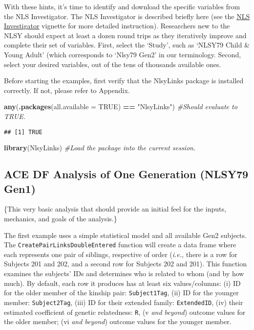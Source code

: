 \documentclass[smallextended]{svjour3}       %
\newenvironment{Shaded}{\begin{snugshade}}{\end{snugshade}}
\newcommand{\CommentTok}[1]{\textcolor[rgb]{0.56,0.35,0.01}{\textit{#1}}}
\newcommand{\DataTypeTok}[1]{\textcolor[rgb]{0.13,0.29,0.53}{#1}}
\newcommand{\KeywordTok}[1]{\textcolor[rgb]{0.13,0.29,0.53}{\textbf{#1}}}
\newcommand{\NormalTok}[1]{#1}
\newcommand{\OperatorTok}[1]{\textcolor[rgb]{0.81,0.36,0.00}{\textbf{#1}}}
\newcommand{\OtherTok}[1]{\textcolor[rgb]{0.56,0.35,0.01}{#1}}
\newcommand{\StringTok}[1]{\textcolor[rgb]{0.31,0.60,0.02}{#1}}
\begin{document}
With these hints, it's time to identify and download the specific
variables from the NLS Investigator. The NLS Investigator is described
briefly here (see the
\href{https://github.com/nlsy-links/NlsyLinks/blob/master/inst/doc/NlsInvestigator.pdf}{NLS
Investigator} vignette for more detailed instruction). Researchers new
to the NLSY should expect at least a dozen round trips as they
iteratively improve and complete their set of variables. First, select
the `Study', such as `NLSY79 Child \& Young Adult' (which corresponds to
`Nlsy79 Gen2' in our terminology. Second, select your desired variables,
out of the tens of thousands available ones.

Before starting the examples, first verify that the NlsyLinks package is
installed correctly. If not, please refer to Appendix.

\begin{Shaded}
\begin{Highlighting}[]
\KeywordTok{any}\NormalTok{(}\KeywordTok{.packages}\NormalTok{(}\DataTypeTok{all.available =} \OtherTok{TRUE}\NormalTok{) }\OperatorTok{==}\StringTok{ "NlsyLinks"}\NormalTok{) }\CommentTok{#Should evaluate to TRUE.}
\end{Highlighting}
\end{Shaded}

\begin{verbatim}
## [1] TRUE
\end{verbatim}

\begin{Shaded}
\begin{Highlighting}[]
\KeywordTok{library}\NormalTok{(NlsyLinks) }\CommentTok{#Load the package into the current session.}
\end{Highlighting}
\end{Shaded}

\hypertarget{ace-df-analysis-of-one-generation-nlsy79-gen1}{%
\subsection{ACE DF Analysis of One Generation (NLSY79
Gen1)}\label{ace-df-analysis-of-one-generation-nlsy79-gen1}}

\{This very basic analysis that should provide an initial feel for the
inputs, mechanics, and goals of the analysis.\}

The first example uses a simple statistical model and all available Gen2
subjects. The \texttt{CreatePairLinksDoubleEntered} function will create
a data frame where each represents one pair of siblings, respective of
order (\emph{i.e.}, there is a row for Subjects 201 and 202, and a
second row for Subjects 202 and 201). This function examines the
subjects' IDs and determines who is related to whom (and by how much).
By default, each row it produces has at least six values/columns: (i) ID
for the older member of the kinship pair: \texttt{Subject1Tag}, (ii) ID
for the younger member: \texttt{Subject2Tag}, (iii) ID for their
extended family: \texttt{ExtendedID}, (iv) their estimated coefficient
of genetic relatedness: \texttt{R}, (v \emph{and beyond}) outcome values
for the older member; (vi \emph{and beyond}) outcome values for the
younger member.
\end{document}
